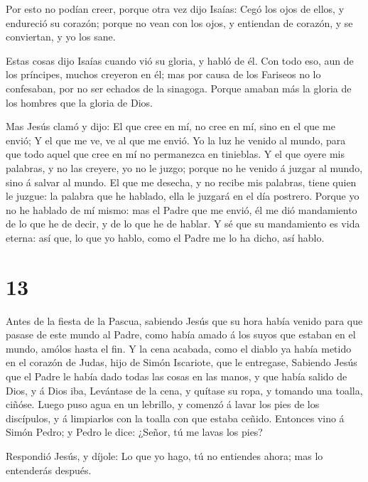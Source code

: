  Por esto no podían creer, porque otra vez dijo Isaías:
 Cegó los ojos de ellos, y endureció su corazón; porque no
vean con los ojos, y entiendan de corazón, y se conviertan, y yo los
sane.

 Estas cosas dijo Isaías cuando vió su gloria, y habló de
él.  Con todo eso, aun de los príncipes, muchos creyeron en
él; mas por causa de los Fariseos no lo confesaban, por no ser echados
de la sinagoga.  Porque amaban más la gloria de los hombres
que la gloria de Dios.

 Mas Jesús clamó y dijo: El que cree en mí, no cree en mí,
sino en el que me envió;  Y el que me ve, ve al que me
envió.  Yo la luz he venido al mundo, para que todo aquel
que cree en mí no permanezca en tinieblas.  Y el que oyere
mis palabras, y no las creyere, yo no le juzgo; porque no he venido á
juzgar al mundo, sino á salvar al mundo.  El que me
desecha, y no recibe mis palabras, tiene quien le juzgue: la palabra que
he hablado, ella le juzgará en el día postrero.  Porque yo
no he hablado de mí mismo: mas el Padre que me envió, él me dió
mandamiento de lo que he de decir, y de lo que he de hablar.
 Y sé que su mandamiento es vida eterna: así que, lo que yo
hablo, como el Padre me lo ha dicho, así hablo.

\hypertarget{section-12}{%
\section{13}\label{section-12}}

 Antes de la fiesta de la Pascua, sabiendo Jesús que su hora
había venido para que pasase de este mundo al Padre, como había amado á
los suyos que estaban en el mundo, amólos hasta el fin.  Y
la cena acabada, como el diablo ya había metido en el corazón de Judas,
hijo de Simón Iscariote, que le entregase,  Sabiendo Jesús
que el Padre le había dado todas las cosas en las manos, y que había
salido de Dios, y á Dios iba,  Levántase de la cena, y
quítase su ropa, y tomando una toalla, ciñóse.  Luego puso
agua en un lebrillo, y comenzó á lavar los pies de los discípulos, y á
limpiarlos con la toalla con que estaba ceñido.  Entonces
vino á Simón Pedro; y Pedro le dice: ¿Señor, tú me lavas los pies?

 Respondió Jesús, y díjole: Lo que yo hago, tú no entiendes
ahora; mas lo entenderás después.

